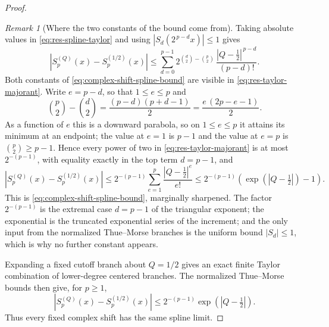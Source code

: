 \documentclass[11pt,oneside]{article}
\theoremstyle{definition}
\theoremstyle{remark}
\newtheorem{remark}[theorem]{Remark}
\begin{document}
\begin{proof}
\begin{remark}[Where the two constants of the bound come from]
\label{rem:res-taylor-constants}
Taking absolute values in \eqref{eq:res-spline-taylor} and using
$\left|S_d(2^{\,p-d}x)\right|\le1$ gives
\begin{equation}
 \left|S_p^{(Q)}(x)-S_p^{(1/2)}(x)\right|
 \le\sum_{d=0}^{p-1}2^{\binom d2-\binom p2}\,
 \frac{\left|Q-\tfrac12\right|^{\,p-d}}{(p-d)!}.          \label{eq:res-taylor-majorant}
\end{equation}
Both constants of \eqref{eq:complex-shift-spline-bound} are visible in
\eqref{eq:res-taylor-majorant}.  Write $e=p-d$, so that $1\le e\le p$ and
\[
 \binom p2-\binom d2=\frac{(p-d)(p+d-1)}2=\frac{e\,(2p-e-1)}2.
\]
As a function of $e$ this is a downward parabola, so on $1\le e\le p$ it attains its minimum
at an endpoint; the value at $e=1$ is $p-1$ and the value at $e=p$ is
$\binom p2\ge p-1$.  Hence every power of two in \eqref{eq:res-taylor-majorant} is at most
$2^{-(p-1)}$, with equality exactly in the top term $d=p-1$, and
\begin{equation}
 \left|S_p^{(Q)}(x)-S_p^{(1/2)}(x)\right|
 \le2^{-(p-1)}\sum_{e=1}^{p}\frac{\left|Q-\tfrac12\right|^{e}}{e!}
 \le2^{-(p-1)}\left(\exp\!\left(\left|Q-\tfrac12\right|\right)-1\right).
                                                          \label{eq:res-taylor-bound}
\end{equation}
This is \eqref{eq:complex-shift-spline-bound}, marginally sharpened.  The factor
$2^{-(p-1)}$ is the extremal case $d=p-1$ of the triangular exponent; the exponential is the
truncated exponential series of the increment; and the only input from the normalized
Thue--Morse branches is the uniform bound $\left|S_d\right|\le1$, which is why no further
constant appears.
\end{remark}

Expanding a fixed cutoff branch about $Q=1/2$ gives an exact finite Taylor combination of
lower-degree centered branches.  The normalized Thue--Morse bounds then give, for $p\ge1$,
\begin{equation}
 \left|S_p^{(Q)}(x)-S_p^{(1/2)}(x)\right|
 \le2^{-(p-1)}\exp\!\left(|Q-\tfrac12|\right).            \label{eq:complex-shift-spline-bound}
\end{equation}
Thus every fixed complex shift has the same spline limit.


\end{proof}
\end{document}
